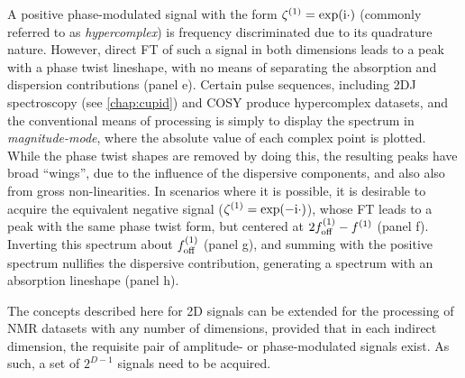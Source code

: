 A positive phase-modulated signal with the form $\zeta^{(1)} = \exp(\mathrm{i} \cdot)$
(commonly referred to as \emph{hypercomplex}) is frequency discriminated due to
its quadrature nature. However, direct \ac{FT} of such a signal in both
dimensions leads to a peak with a phase twist lineshape, with no means of
separating the absorption and dispersion contributions (panel e). Certain pulse
sequences, including \ac{2DJ} spectroscopy\cite{Aue1976,Morris2009} (see
\cref{chap:cupid}) and
\ac{COSY}\cite{Jeener1971,Jeener2016,Aue1976a} produce hypercomplex datasets,
and the conventional means of processing is simply to display the
spectrum in \emph{magnitude-mode}, where the absolute value of each complex
point is plotted. While the phase twist shapes are removed by doing this, the
resulting peaks have broad ``wings'', due to the influence of the
dispersive components, and also also from gross non-linearities. In scenarios
where it is possible, it is desirable to acquire the equivalent negative
signal ($\zeta^{(1)} = \exp(-\mathrm{i} \cdot)$), whose \ac{FT} leads to a peak with
the same phase twist form, but centered at $2f_{\mathrm{off}}^{(1)} - f^{(1)}$ (panel f).
Inverting this spectrum about $f_{\mathrm{off}}^{(1)}$ (panel g), and summing with the positive
spectrum nullifies the dispersive contribution, generating a spectrum with an
absorption lineshape\cite{Davis1992} (panel h).

The concepts described here for \ac{2D} signals can be extended for the
processing of \ac{NMR} datasets with any number of dimensions, provided that in
each indirect dimension, the requisite pair of amplitude- or phase-modulated
signals exist. As such, a set of $2^{D-1}$ signals need to be acquired.

